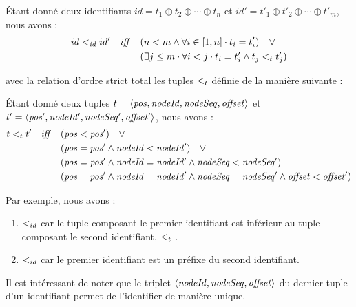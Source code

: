 \begin{definition}
  Étant donné deux identifiants $id = t_1 \oplus t_2 \oplus \cdots \oplus t_n$ et $id' = t'_1 \oplus t'_2 \oplus \cdots \oplus t'_m$, nous avons :
  \begin{equation*}
    \begin{split}
      id <_{id} id' \quad \mathit{iff} \quad     & (n < m \land \forall i \in [1,n] \cdot t_i = t'_i) \quad \lor \\
                                            & (\exists j \leq m \cdot \forall i < j \cdot t_i = t'_i \land t_j <_{t} t'_j) \\
    \end{split}
  \end{equation*}
\end{definition}
avec la relation d'ordre strict total les tuples $<_{t}$ définie de la manière suivante :
\begin{definition}
  Étant donné deux tuples $t = \langle \mathit{pos},\mathit{nodeId},\mathit{nodeSeq},\mathit{offset} \rangle$ et $t' = \langle \mathit{pos'},\mathit{nodeId'},\mathit{nodeSeq'},\mathit{offset'} \rangle$, nous avons :
  \begin{equation*}
    \begin{split}
      t <_{t} t' \quad \mathit{iff} \quad  & (\mathit{pos} < \mathit{pos}') \quad \lor \\
                                          & (\mathit{pos} = \mathit{pos'} \land \mathit{nodeId} < \mathit{nodeId'}) \quad \lor \\
                                          & (\mathit{pos} = \mathit{pos'} \land \mathit{nodeId} = \mathit{nodeId'} \land \mathit{nodeSeq} < \mathit{nodeSeq'}) \\
                                          & (\mathit{pos} = \mathit{pos'} \land \mathit{nodeId} = \mathit{nodeId'} \land \mathit{nodeSeq} = \mathit{nodeSeq'} \land \mathit{offset} < \mathit{offset'}) \\
    \end{split}
  \end{equation*}
\end{definition}

Par exemple, nous avons :
\begin{enumerate}
  \item  {} $<_{id}$  car le tuple composant le premier identifiant est inférieur au tuple composant le second identifiant, \ie {} $<_{t}$ .
  \item {} $<_{id}$  car le premier identifiant est un préfixe du second identifiant.
\end{enumerate}

Il est intéressant de noter que le triplet $\langle \mathit{nodeId},\mathit{nodeSeq},\mathit{offset} \rangle$ du dernier tuple d'un identifiant permet de l'identifier de manière unique.
